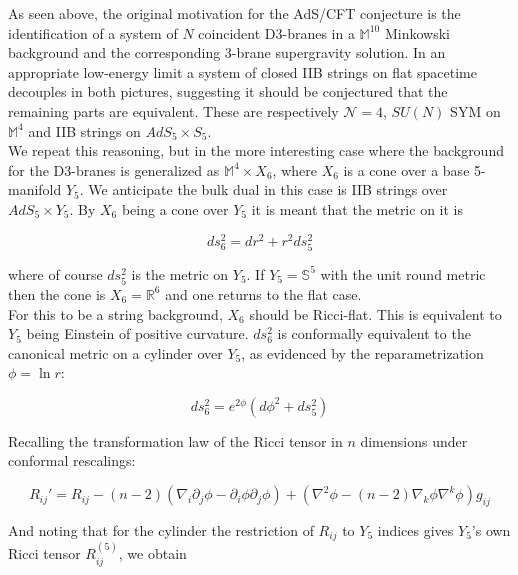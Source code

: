 \documentclass[11pt,a4paper,oneside,openright,titlepage]{book}
\begin{document}
As seen above, the original motivation for the AdS/CFT conjecture is the identification of a system of $N$ coincident D3-branes in a $\mathbb{M}^{10}$ Minkowski background and the corresponding 3-brane supergravity solution. In an appropriate low-energy limit a system of closed IIB strings on flat spacetime decouples in both pictures, suggesting it should be conjectured that the remaining parts are equivalent. These are respectively $\mathcal{N}=4$, $SU(N)$ SYM on $\mathbb{M}^4$ and IIB strings on $AdS_5 \times S_5$.\\

We repeat this reasoning, but in the more interesting case where the background for the D3-branes is generalized as $\mathbb{M}^4 \times X_6$, where $X_6$ is a cone over a base 5-manifold $Y_5$. We anticipate the bulk dual in this case is IIB strings over $AdS_5 \times Y_5$. By $X_6$ being a cone over $Y_5$ it is meant that the metric on it is

\begin{equation}
	ds^2_6 = dr^2 + r^2 ds_5^2 \label{conemetric}
\end{equation}

where of course $ds_5^2$ is the metric on $Y_5$. If $Y_5 = \mathbb{S}^5$ with the unit round metric then the cone is $X_6 = \mathbb{R}^6$ and one returns to the flat case.\\

For this to be a string background, $X_6$ should be Ricci-flat. This is equivalent to $Y_5$ being Einstein of positive curvature. $ds_6^2$ is conformally equivalent to the canonical metric on a cylinder over $Y_5$, as evidenced by the reparametrization $\phi = \ln r$:

\begin{equation}
	ds_6^2 = e^{2\phi} \left( d\phi^2 + ds_5^2 \right)
\end{equation}

Recalling the transformation law of the Ricci tensor in $n$ dimensions under conformal rescalings:

\begin{equation}
	R_{ij}' = R_{ij} - (n-2)\left( \nabla_i \partial_j \phi - \partial_i \phi \partial_j \phi \right) + \left( \nabla^2 \phi - (n-2) \nabla_k \phi \nabla^k \phi \right) g_{ij}
\end{equation}

And noting that for the cylinder the restriction of $R_{ij}$ to $Y_5$ indices gives $Y_5$'s own Ricci tensor $R_{ij}^{(5)}$, we obtain
\end{document}
